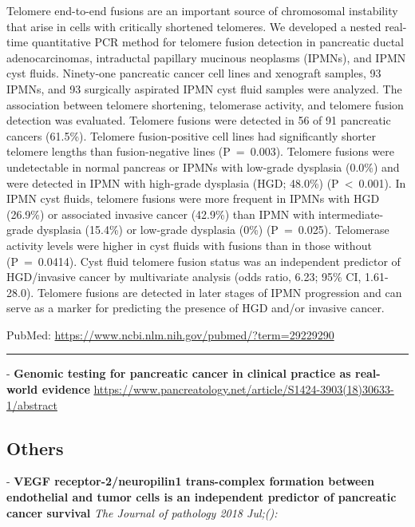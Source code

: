 \documentclass[]{article}
\begin{document}
Telomere end-to-end fusions are an important source of chromosomal
instability that arise in cells with critically shortened telomeres. We
developed a nested real-time quantitative PCR method for telomere fusion
detection in pancreatic ductal adenocarcinomas, intraductal papillary
mucinous neoplasms (IPMNs), and IPMN cyst fluids. Ninety-one pancreatic
cancer cell lines and xenograft samples, 93 IPMNs, and 93 surgically
aspirated IPMN cyst fluid samples were analyzed. The association between
telomere shortening, telomerase activity, and telomere fusion detection
was evaluated. Telomere fusions were detected in 56 of 91 pancreatic
cancers (61.5\%). Telomere fusion-positive cell lines had significantly
shorter telomere lengths than fusion-negative lines (P~=~0.003).
Telomere fusions were undetectable in normal pancreas or IPMNs with
low-grade dysplasia (0.0\%) and were detected in IPMN with high-grade
dysplasia (HGD; 48.0\%) (P~\textless{}~0.001). In IPMN cyst fluids,
telomere fusions were more frequent in IPMNs with HGD (26.9\%) or
associated invasive cancer (42.9\%) than IPMN with intermediate-grade
dysplasia (15.4\%) or low-grade dysplasia (0\%) (P~=~0.025). Telomerase
activity levels were higher in cyst fluids with fusions than in those
without (P~=~0.0414). Cyst fluid telomere fusion status was an
independent predictor of HGD/invasive cancer by multivariate analysis
(odds ratio, 6.23; 95\% CI, 1.61-28.0). Telomere fusions are detected in
later stages of IPMN progression and can serve as a marker for
predicting the presence of HGD and/or invasive cancer.

PubMed: \url{https://www.ncbi.nlm.nih.gov/pubmed/?term=29229290}

{}

{}

\begin{center}\rule{0.5\linewidth}{\linethickness}\end{center}

 - \textbf{Genomic testing for pancreatic cancer in clinical practice as
real-world evidence}
\url{https://www.pancreatology.net/article/S1424-3903(18)30633-1/abstract}

\pagebreak

\hypertarget{others}{%
\subsection{Others}\label{others}}

 - \textbf{VEGF receptor-2/neuropilin1 trans-complex formation between
endothelial and tumor cells is an independent predictor of pancreatic
cancer survival} \emph{The Journal of pathology 2018 Jul;():}
\end{document}
